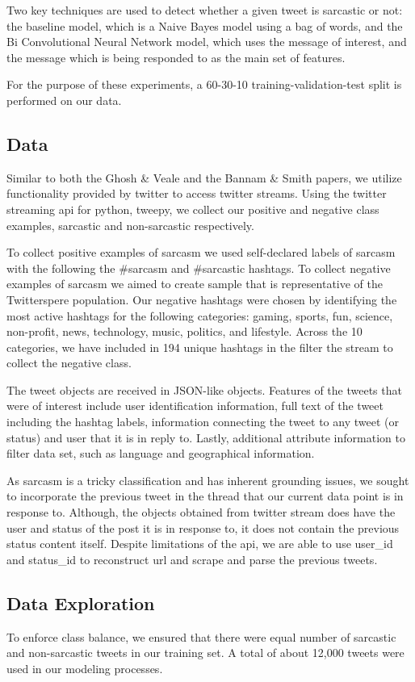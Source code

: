 \documentclass[11pt,a4paper]{article}
\begin{document}
Two key techniques are used to detect whether a given tweet is sarcastic or not: the baseline model, which is a Naive Bayes model using a bag of words, and the Bi Convolutional Neural Network model,  which uses the message of interest, and the message which is being responded to as the main set of features.

For the purpose of these experiments, a 60-30-10 training-validation-test split is performed on our data. 

\subsection{Data}
Similar to both the Ghosh \& Veale and the Bannam \& Smith papers, we utilize functionality provided by twitter to access twitter streams. Using the twitter streaming api for python, tweepy, we collect our positive and negative class examples, sarcastic and non-sarcastic respectively.  

To collect positive examples of sarcasm we used self-declared labels of sarcasm with the following the \#sarcasm and \#sarcastic hashtags.  To collect negative examples of sarcasm we aimed to create sample that is representative of the Twitterspere population. Our negative hashtags were chosen by identifying the most active hashtags for the following categories:  gaming, sports, fun, science, non-profit, news, technology, music, politics, and lifestyle.  Across the 10 categories, we have included in 194 unique hashtags in the filter the stream to collect the negative class.  

The tweet objects are received in JSON-like objects.  Features of the tweets that were of interest include user identification information, full text of the tweet including the hashtag labels, information connecting the tweet to any tweet (or status) and user that it is in reply to.  Lastly, additional attribute information to filter data set, such as language and geographical information. 

As sarcasm is a tricky classification and has inherent grounding issues, we sought to incorporate the previous tweet in the thread that our current data point is in response to.   Although, the objects obtained from twitter stream does have the user and status of the post it is in response to, it does not contain the previous status content itself.  Despite limitations of the api, we are able to use user\_id and status\_id to reconstruct url and scrape and parse the previous tweets. 

\subsection{Data Exploration}
To enforce class balance, we ensured that there were equal number of sarcastic and non-sarcastic tweets in our training set. A total of about 12,000 tweets were used in our modeling processes.
\end{document}
